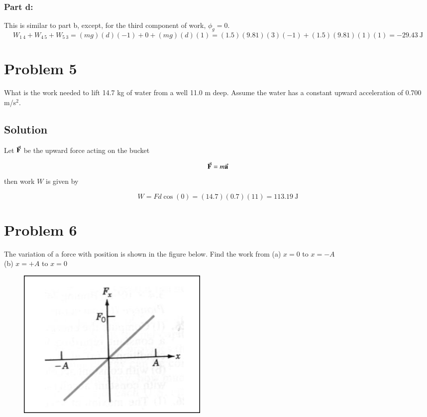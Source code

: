\documentclass{article}
\begin{document}
\subsubsection*{Part d:}
This is similar to part b, except, for the third component of work, $\phi_g = 0$.
\[
	W_{1\ 4} + W_{4\ 5} + W_{5\ 3} = (mg)(d)(-1) + 0  + (mg)(d)(1)= (1.5)(9.81)(3)(-1) +  (1.5)(9.81)(1)(1) = \boxed{-29.43\ \text{J}}
\]

\section*{Problem 5}
What is the work needed to lift 14.7 kg of water from a well 11.0 m deep. Assume the water has a constant
upward acceleration of 0.700 m/s$^2$.

\subsection*{Solution}
Let $\va{F}$ be the upward force acting on the bucket

\[
	\va{F} = m \va{a}
\]
then work $W$ is given by

\[
	W = Fd \cos(0) = (14.7)(0.7)(11) = \boxed{113.19\ \text{J}}
\]

\section*{Problem 6}
The variation of a force with position is shown in the figure below. Find the work from
(a) $x = 0$ to $x = -A$ \\
(b) $x = +A$ to $x = 0$

\begin{figure}[ht]
    \centering
    \includegraphics[scale=.4]{drawing-2.png}
\end{figure}
\end{document}
